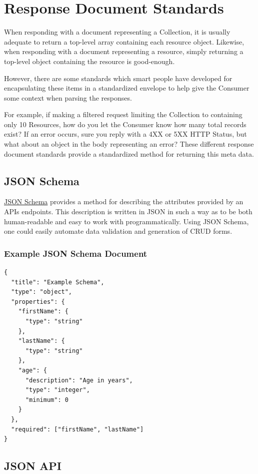\documentclass{book}
\begin{document}
\section{Response Document Standards}

When responding with a document representing a Collection, it is usually adequate to return a top-level array containing each resource object. Likewise, when responding with a document representing a resource, simply returning a top-level object containing the resource is good-enough.

However, there are some standards which smart people have developed for encapsulating these items in a standardized envelope to help give the Consumer some context when parsing the responses.

For example, if making a filtered request limiting the Collection to containing only 10 Resources, how do you let the Consumer know how many total records exist? If an error occurs, sure you reply with a 4XX or 5XX HTTP Status, but what about an object in the body representing an error? These different response document standards provide a standardized method for returning this meta data.

\subsection{JSON Schema}

\href{http://json-schema.org/}{JSON Schema} \cite{JSONSCHEMA} provides a method for describing the attributes provided by an APIs endpoints. This description is written in JSON in such a way as to be both human-readable and easy to work with programmatically. Using JSON Schema, one could easily automate data validation and generation of CRUD forms.

\subsubsection{Example JSON Schema Document}

\begin{verbatim}
{
  "title": "Example Schema",
  "type": "object",
  "properties": {
    "firstName": {
      "type": "string"
    },
    "lastName": {
      "type": "string"
    },
    "age": {
      "description": "Age in years",
      "type": "integer",
      "minimum": 0
    }
  },
  "required": ["firstName", "lastName"]
}
\end{verbatim}

\subsection{JSON API}
\end{document}
